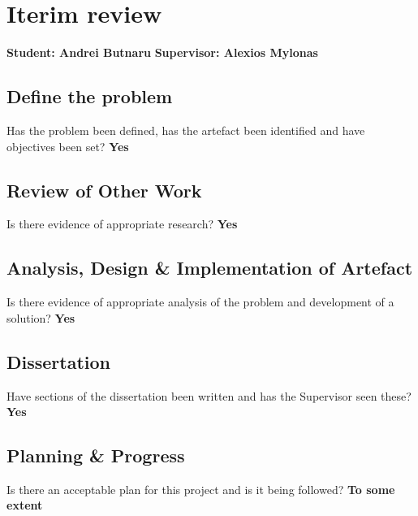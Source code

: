 \chapter{Iterim review}
\textbf{Student: Andrei Butnaru} \textbf{Supervisor: Alexios Mylonas}


\tocless\section{Define the problem}

\begin{mdframed}
    Has the problem been defined, has the artefact been identified and have objectives been set?
    \textbf{Yes}
\end{mdframed}

\tocless\section{Review of Other Work}
\begin{mdframed}
    Is there evidence of appropriate research?
    \textbf{Yes}
\end{mdframed}

\tocless\section{Analysis, Design \& Implementation of Artefact}
\begin{mdframed}
    Is there evidence of appropriate analysis of the problem and development of a solution?
    \textbf{Yes}
\end{mdframed}

\tocless\section{Dissertation}
\begin{mdframed}
    Have sections of the dissertation been written and has the Supervisor seen these?
    \textbf{Yes}
\end{mdframed}

\tocless\section{Planning \& Progress}
\begin{mdframed}
    Is there an acceptable plan for this project and is it being followed?
    \textbf{To some extent}
\end{mdframed}

